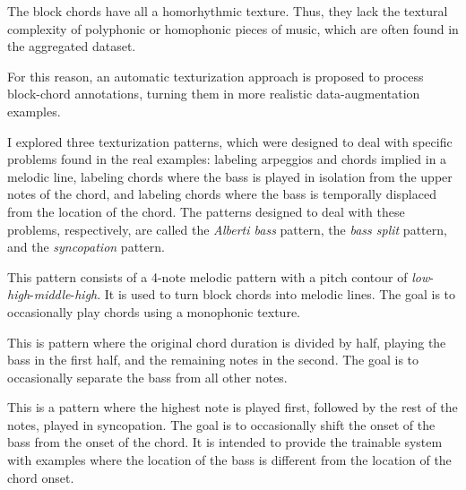 
The block chords have all a homorhythmic texture. Thus, they
lack the textural complexity of polyphonic or homophonic
pieces of music, which are often found in the aggregated
dataset.

For this reason, an automatic texturization approach is
proposed to process block-chord annotations, turning them in
more realistic data-augmentation examples.

I explored three texturization patterns, which were designed
to deal with specific problems found in the real examples:
labeling arpeggios and chords implied in a melodic line,
labeling chords where the bass is played in isolation from
the upper notes of the chord, and labeling chords where the
bass is temporally displaced from the location of the chord.
The patterns designed to deal with these problems,
respectively, are called the \emph{Alberti bass} pattern,
the \emph{bass split} pattern, and the \emph{syncopation}
pattern.


This pattern consists of a 4-note melodic pattern with a
pitch contour of
\emph{low}-\emph{high}-\emph{middle}-\emph{high}. It is used
to turn block chords into melodic lines. The goal is to
occasionally play chords using a monophonic texture.



This is pattern where the original chord duration is divided
by half, playing the bass in the first half, and the
remaining notes in the second. The goal is to occasionally
separate the bass from all other notes.



This is a pattern where the highest note is played first,
followed by the rest of the notes, played in syncopation.
The goal is to occasionally shift the onset of the bass from
the onset of the chord. It is intended to provide the
trainable system with examples where the location of the
bass is different from the location of the chord onset.


